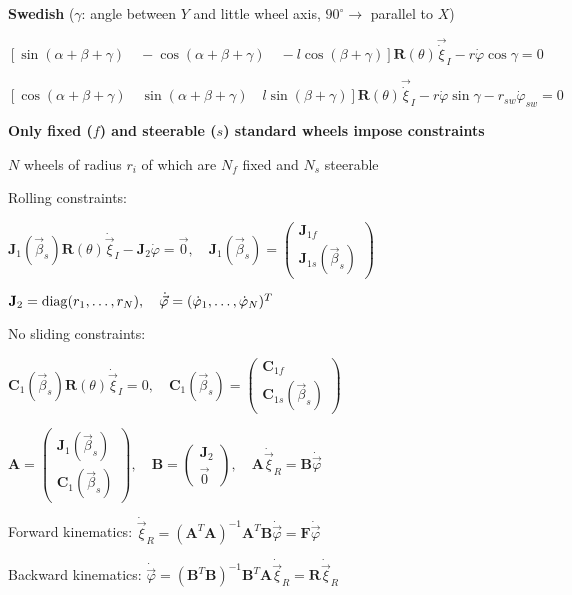 \documentclass[fontsize=6pt]{scrartcl}
\newcommand{\mat}[1]{\mathbf{#1}}
\begin{document}
\begin{multicols*}{4}
\textbf{Swedish} ($\gamma$: angle between $Y$ and little wheel axis, $90^{\circ} \rightarrow$ parallel to $X$)

$ \left[\sin(\alpha + \beta + \gamma) \quad -\cos(\alpha + \beta + \gamma) \quad -l\cos(\beta+\gamma)\right]\mat R(\theta) \vec\dot{\xi}_I - r\dot{\varphi}\cos\gamma = 0$

$ \left[ \cos(\alpha + \beta + \gamma) \quad \sin(\alpha + \beta + \gamma) \quad l\sin(\beta + \gamma)\right]\mat R(\theta) \vec\dot{\xi}_I - r\dot{\varphi}\sin\gamma - r_{sw}\dot{\varphi}_{sw}= 0$

\textbf{Only fixed ($f$) and steerable ($s$) standard wheels impose constraints}

$N$ wheels of radius $r_i$ of which are $N_f$ fixed and $N_s$ steerable

Rolling constraints:

$ \mat J_1(\vec\beta_s) \mat R(\theta) \dot{\vec{\xi}}_I - \mat J_2 \dot{\varphi} = \vec 0, \quad \mat J_1(\vec\beta_s) =
\begin{pmatrix}
\mat J_{1f}\\
\mat J_{1s}(\vec\beta_s)
\end{pmatrix}$

$
\mat J_2 = \diag(r_1, \ldots, r_N), \quad \dot{\vec \varphi} = (\dot{\varphi}_1, \ldots, \dot{\varphi}_N)^T
$

No sliding constraints:

$\mat C_1(\vec \beta_s) \mat R(\theta) \dot{\vec{\xi}}_I = 0, \quad
\mat C_1(\vec \beta_s) =
\begin{pmatrix}
\mat C_{1f}\\
\mat C_{1s}(\vec\beta_s)
\end{pmatrix}
$

$ \mat A =
\begin{pmatrix}
\mat J_1(\vec{\beta}_s)\\
\mat C_1(\vec \beta_s)
\end{pmatrix}
, \quad
\mat B =
\begin{pmatrix}
\mat J_2\\
\vec{0}
\end{pmatrix}, \quad
\mat A \dot{\vec \xi}_R = \mat B \dot{\vec{\varphi}}
$

Forward kinematics: $ \dot{\vec{\xi}}_R = (\mat A^T \mat A)^{-1}\mat A^T \mat B \dot{\vec{\varphi}} = \mat F \dot{\vec{\varphi}}$

Backward kinematics: $ \dot{\vec{\varphi}} = (\mat B^T \mat B)^{-1}\mat B^T \mat A \dot{\vec{\xi}}_R = \mat R \dot{\vec{\xi}}_R$


\end{multicols*}
\end{document}
